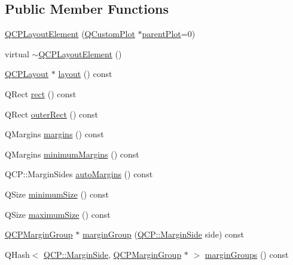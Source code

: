 \subsection*{Public Member Functions}
\begin{DoxyCompactItemize}
\item 
\hyperlink{class_q_c_p_layout_element_a8947f0ada17e672aaba3d424cbbb67e3}{Q\+C\+P\+Layout\+Element} (\hyperlink{class_q_custom_plot}{Q\+Custom\+Plot} $\ast$\hyperlink{class_q_c_p_layerable_ab7e0e94461566093d36ffc0f5312b109}{parent\+Plot}=0)
\item 
virtual \hyperlink{class_q_c_p_layout_element_a0dc52343920011b3e72d61fc94ed3400}{$\sim$\+Q\+C\+P\+Layout\+Element} ()
\item 
\hyperlink{class_q_c_p_layout}{Q\+C\+P\+Layout} $\ast$ \hyperlink{class_q_c_p_layout_element_a6235f5384db871fc6e3387a1bc558b0d}{layout} () const 
\item 
Q\+Rect \hyperlink{class_q_c_p_layout_element_affdfea003469aac3d0fac5f4e06171bc}{rect} () const 
\item 
Q\+Rect \hyperlink{class_q_c_p_layout_element_a60bbddee2d1230c2414bd776f44d17b8}{outer\+Rect} () const 
\item 
Q\+Margins \hyperlink{class_q_c_p_layout_element_a85ff977dfcced84eef32d9f819ec9543}{margins} () const 
\item 
Q\+Margins \hyperlink{class_q_c_p_layout_element_a60ec7f377c26726174d536bffb632002}{minimum\+Margins} () const 
\item 
Q\+C\+P\+::\+Margin\+Sides \hyperlink{class_q_c_p_layout_element_a2f499b1179b3126e22d0d7508124ccb3}{auto\+Margins} () const 
\item 
Q\+Size \hyperlink{class_q_c_p_layout_element_ae71f9230171d2d898e21dc461fc3df03}{minimum\+Size} () const 
\item 
Q\+Size \hyperlink{class_q_c_p_layout_element_a1fc85c79e15c2ab8051eccd455fccc4a}{maximum\+Size} () const 
\item 
\hyperlink{class_q_c_p_margin_group}{Q\+C\+P\+Margin\+Group} $\ast$ \hyperlink{class_q_c_p_layout_element_a22cb1bb62c452fd802e43ca2524660db}{margin\+Group} (\hyperlink{namespace_q_c_p_a7e487e3e2ccb62ab7771065bab7cae54}{Q\+C\+P\+::\+Margin\+Side} side) const 
\item 
Q\+Hash$<$ \hyperlink{namespace_q_c_p_a7e487e3e2ccb62ab7771065bab7cae54}{Q\+C\+P\+::\+Margin\+Side}, \hyperlink{class_q_c_p_margin_group}{Q\+C\+P\+Margin\+Group} $\ast$ $>$ \hyperlink{class_q_c_p_layout_element_a48eb87f787d3e3bfb3fa335d2cf6b1af}{margin\+Groups} () const 

\end{DoxyCompactItemize}
